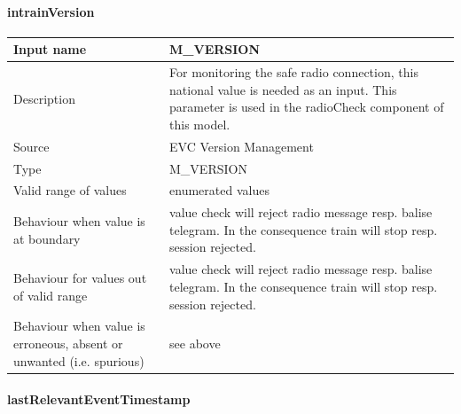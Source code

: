 \paragraph{intrainVersion}

\begin{longtable}{p{}p{}}
\toprule
Input name				& M\_VERSION \\
\midrule
Description				& For monitoring the safe radio connection, this national value is needed as an input. This parameter is used in the radioCheck component of this model. \\
\midrule
Source					& EVC Version Management\\ 
\midrule
Type					& M\_VERSION \\
\midrule
Valid range of values	& enumerated values\\
\midrule
Behaviour when value is at boundary	& value check will reject radio message resp. balise telegram. In the consequence train will stop resp. session rejected. \\
\midrule
Behaviour for values out of valid range	& value check will reject radio message resp. balise telegram. In the consequence train will stop resp. session rejected.\\
\midrule
Behaviour when value is erroneous, absent or unwanted (i.e. spurious) & see above \\
\bottomrule
\end{longtable}


\paragraph{lastRelevantEventTimestamp}

